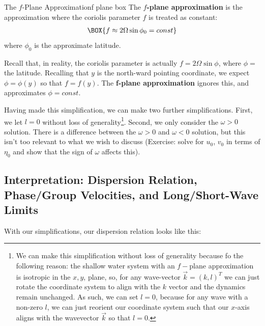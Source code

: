\begin{fact}{The \(f\)-Plane Approximation}{f plane box}\label{f plane box}
    The \textbf{\(f\)-plane approximation} is the approximation where the coriolis parameter \(f\) is treated as constant:
    \begin{align*}
        \BOX{f\approx2\Omega\sin\phi_0=const}
    \end{align*}
    where \(\phi_0\) is the approximate latitude.
    
    Recall that, in reality, the coriolis parameter is actually \(f=2\Omega \sin \phi\), where \(\phi=\) the latitude. Recalling that \(y\) is the north-ward pointing coordinate, we expect \(\phi=\phi(y)\) so that \(f=f(y)\). The \textbf{f-plane approximation} ignores this, and approximates \(\phi=const\).
\end{fact}

Having made this simplification, we can make two further simplifications. First, we let \(l=0\) without loss of generality\footnote{
    We can make this simplification without loss of generality because fo the following reason: the shallow water system with an \(f-\)plane approximation is isotropic in the \(x,y\), plane, so, for any wave-vector \(\vec{k}=(k,l)^T\) we can just rotate the coordinate system to align with the \(k\) vector and the dynamics remain unchanged. As such, we can set \(l=0\), because for any wave with a non-zero \(l\), we can just reorient our coordinate system such that our \(x\)-axis aligns with the wavevector \(\vec{k}\) so that \(l=0\).
}. Second, we only consider the \(\omega>0\) solution. There is a difference between the \(\omega>0\) and \(\omega<0\) solution, but this isn't too relevant to what we wish to discuss (Exercise: solve for \(u_0\), \(v_0\) in terms of \(\eta_0\) and show that the sign of \(\omega\) affects this).

\subsection{Interpretation: Dispersion Relation, Phase/Group Velocities, and Long/Short-Wave Limits}

With our simplifications, our dispersion relation looks like this:

